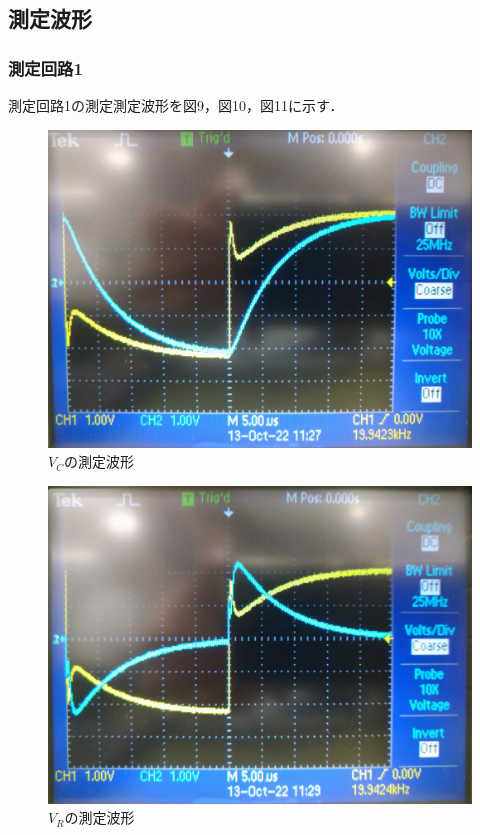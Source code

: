\subsection{測定波形}
\subsubsection{測定回路1}
測定回路1の測定測定波形を図9，図10，図11に示す．
\begin{figure}[H]
    \begin{center}
        \includegraphics[keepaspectratio, scale=0.3]{DSC_0235.pdf}
        \caption{$V_C$の測定波形}
    \end{center}
\end{figure}

\begin{figure}[H]
    \begin{center}
        \includegraphics[keepaspectratio, scale=0.3]{DSC_0236.pdf}
        \caption{$V_R$の測定波形}
    \end{center}
\end{figure}

